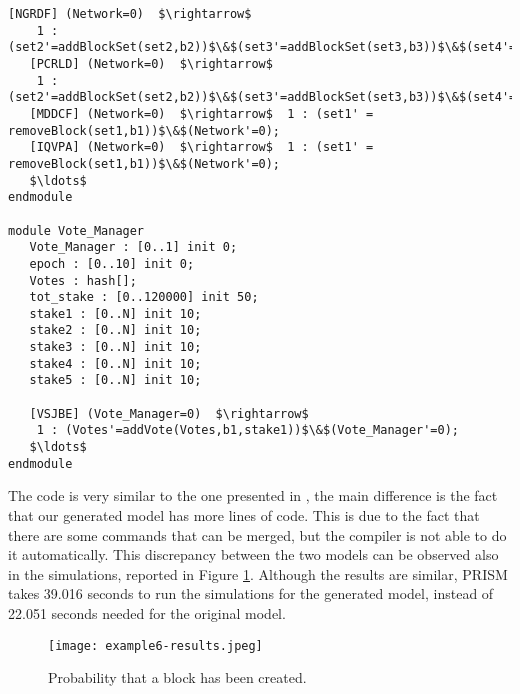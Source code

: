 \begin{lstlisting}[style=prism-color,caption={Generated PRISM program for the Hybrid Casper	Protocol.},captionpos=b,label={ex5-gen}]
   [NGRDF] (Network=0)  $\rightarrow$  
   	1 : (set2'=addBlockSet(set2,b2))$\&$(set3'=addBlockSet(set3,b3))$\&$(set4'=addBlockSet(set4,b4))$\&$(set5'=addBlockSet(set5,b5))$\&$(Network'=0); 
   [PCRLD] (Network=0)  $\rightarrow$  
   	1 : (set2'=addBlockSet(set2,b2))$\&$(set3'=addBlockSet(set3,b3))$\&$(set4'=addBlockSet(set4,b4))$\&$(set5'=addBlockSet(set5,b5))$\&$(Network'=0); 
   [MDDCF] (Network=0)  $\rightarrow$  1 : (set1' = removeBlock(set1,b1))$\&$(Network'=0); 
   [IQVPA] (Network=0)  $\rightarrow$  1 : (set1' = removeBlock(set1,b1))$\&$(Network'=0); 
   $\ldots$
endmodule

module Vote_Manager
   Vote_Manager : [0..1] init 0;
   epoch : [0..10] init 0;
   Votes : hash[];  
   tot_stake : [0..120000] init 50; 
   stake1 : [0..N] init 10; 
   stake2 : [0..N] init 10; 
   stake3 : [0..N] init 10; 
   stake4 : [0..N] init 10; 
   stake5 : [0..N] init 10; 

   [VSJBE] (Vote_Manager=0)  $\rightarrow$  
   	1 : (Votes'=addVote(Votes,b1,stake1))$\&$(Vote_Manager'=0); 
   $\ldots$
endmodule

\end{lstlisting}

The code is very similar to the one presented in \cite{DBLP:journals/distribledger/GallettaLMV23},
the main difference is the fact that our generated model has more lines of code.
This is due to the fact that there are some commands that can be merged, but the compiler is not able to do it automatically.
This discrepancy between the two models can be observed also in the simulations, reported in Figure \ref{ex5-res}.
Although the results are similar, PRISM takes 39.016 seconds to run the simulations for the generated model, 
instead of 22.051 seconds needed for the original model.

\begin{figure}[h]
\centering
\texttt{[image: example6-results.jpeg]}	
\caption{Probability that a block has been created.}
\label{ex5-res}
\end{figure}
